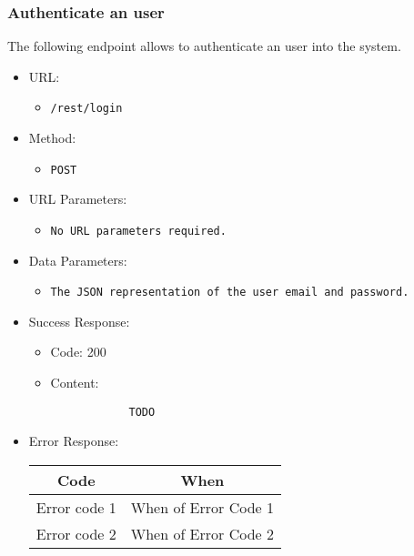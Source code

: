 \subsubsection*{Authenticate an user}

The following endpoint allows to authenticate an user into the system.

\begin{itemize}
    
    \item URL: 
    \begin{itemize}
        \item \texttt{/rest/login}
    \end{itemize}
    
    \item Method: 
    \begin{itemize}
        \item \texttt{POST}
    \end{itemize}
    
    \item URL Parameters: 
    \begin{itemize}
        \item \texttt{No URL parameters required.} 
    \end{itemize}
    
    \item Data Parameters: 
    \begin{itemize}
        \item \texttt{The JSON representation of the user email and password.}
    \end{itemize}
    
    \item Success Response: 
    \begin{itemize}
        \item Code: 200
        \item Content:
        \begin{lstlisting}
            TODO
        \end{lstlisting}    
    \end{itemize}
    
    \item Error Response:
    \begin{table}[!h]
    \centering 
    \begin{tabular}{|c|c|}
    \hline
    \multicolumn{1}{|c|}{\textbf{Code}} & \multicolumn{1}{c|}{\textbf{When}} \\ \hline
    Error code 1 & When of Error Code 1 \\\hline
    Error code 2 & When of Error Code 2 \\\hline
    \end{tabular} 
    \end{table} 
    
\end{itemize}


